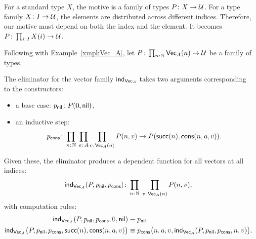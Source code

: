 For a standard type $X$, the motive is a family of types $P\colon X\to\univ$. For a type family $X\colon I\to\univ$, the elements are distributed across different indices. Therefore, our motive must depend on both the index and the element. It becomes $P\colon\prod_{i\colon I}X(i)\to\univ$.

\begin{xmpl}\label{xmpl:Vec_A-ind}
    Following with Example~\ref{xmpl:Vec_A}, let $P \colon \prod_{n\colon\N}\fun{Vec}_A(n)\to\univ$ be a family of types.
    
    The eliminator for the vector family $\mathsf{ind}_{\mathsf{Vec}_A}$ takes two arguments corresponding to the constructors:
    \begin{itemize}
        \item a base case: $p_{\fun{nil}}\colon P(0,\fun{nil})$,

        \item an inductive step:
        \[
            p_{\fun{cons}}\colon
                \prod_{n\colon\N}\;
                \prod_{a\colon A}
                \prod_{v\colon\fun{Vec}_A(n)}
                    P(n,v)
                    \to
                    P(\fun{succ}(n),\fun{cons}(n,a,v)).
        \]
    \end{itemize}
    Given these, the eliminator produces a dependent function for all vectors at all indices:
    \[
        \fun{ind}_{\fun{Vec}_A}(
                P,
                p_{\fun{nil}},
                p_{\fun{cons}}
            )
            \colon
                \prod_{n\colon\N}\;
                \prod_{v\colon\fun{Vec}_A(n)}
                    P(n,v),
    \]
    with computation rules:{\small
    \begin{align*}
        \mathsf{ind}_{\mathsf{Vec}_A}(
                P,
                p_{\mathsf{nil}},
                p_{\mathsf{cons}},
                0,
                \mathsf{nil}
            )
            &\equiv p_{\mathsf{nil}}\\
        \mathsf{ind}_{\mathsf{Vec}_A}\bigl(
                P,
                p_{\mathsf{nil}},
                p_{\mathsf{cons}},
                \mathsf{succ}(n),
                \mathsf{cons}(n,a,v)
            \bigr)
            &\equiv p_{\mathsf{cons}}
                \bigl(
                    n,
                    a,
                    v,
                    \mathsf{ind}_{\mathsf{Vec}_A}(
                            P,
                            p_{\mathsf{nil}},
                            p_{\mathsf{cons}},
                            n,
                            v
                        )
                \bigr).
    \end{align*}}
\end{xmpl}

